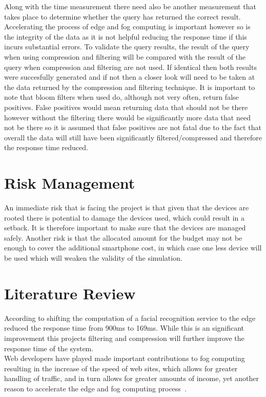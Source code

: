 \documentclass[11pt,journal, a4paper]{IEEEtran}
\begin{document}
\noindent
Along with the time measurement there need also be another measurement that takes place to determine whether the query has returned the correct result. Accelerating the process of edge and fog computing is important however so is the integrity of the data as it is not helpful reducing the response time if this incurs substantial errors. To validate the query results, the result of the query when using compression and filtering will be compared with the result of the query when compression and filtering are not used. If identical then both results were succesfully generated and if not then a closer look will need to be taken at the data returned by the compression and filtering technique. It is important to note that bloom filters when used do, although not very often, return false positives. False positives would mean returning data that should not be there however without the filtering there would be significantly more data that need not be there so it is assumed that false positives are not fatal due to the fact that overall the data will still have been significantly filtered/compressed and therefore the response time reduced.

\section{Risk Management}
\noindent
An immediate risk that is facing the project is that given that the devices are rooted there is potential to damage the devices used, which could result in a setback. It is therefore important to make sure that the devices are managed safely. Another risk is that the allocated amount for the budget may not be enough to cover the additional smartphone cost, in which case one less device will be used which will weaken the validity of the simulation.\\

\section{Literature Review}
\noindent
According to \cite{Vision} shifting the computation of a facial recognition service to the edge reduced the response time from 900ms to 169ms. While this is an significant improvement this projects filtering and compression will further improve the response time of the system.\\

\noindent
Web developers have played made important contributions to fog computing resulting in the increase of the speed of web sites, which allows for greater handling of traffic, and in turn allows for greater amounts of income, yet another reason to accelerate the edge and fog computing process~\cite{R3}. \\
\end{document}
